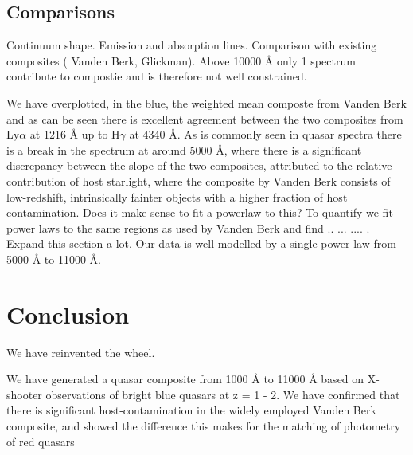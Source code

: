 \documentclass{aa}    %
\newcommand{\sectlabel}[1]{\label{sect:#1}}
\begin{document}
\subsection{Comparisons} \sectlabel{comparison}


Continuum shape. Emission and absorption lines. Comparison with existing composites ( Vanden Berk, Glickman). Above 10000 \r{A} only 1 spectrum contribute to compostie and is therefore not well constrained. 


 We have overplotted, in the blue, the weighted mean composte from Vanden Berk and as can be seen there is excellent agreement between the two composites from Ly$\alpha$ at 1216 \r{A} up to H$\gamma$ at 4340 \r{A}. As is commonly seen in quasar spectra there is a break in the spectrum at around 5000 \r{A}, where there is a significant discrepancy between the slope of the two composites, attributed to the relative contribution of host starlight, where the composite by Vanden Berk consists of low-redshift, intrinsically fainter objects with a higher fraction of host contamination. Does it make sense to fit a powerlaw to this? To quantify we fit power laws to the same regions as used by Vanden Berk and find .. ... .... . Expand this section a lot. Our data is well modelled by a single power law from 5000 \r{A} to 11000 \r{A}. 
 






\section{Conclusion}  \sectlabel{conclusion}


We have reinvented the wheel.

We have generated a quasar composite from 1000 \r{A} to 11000 \r{A} based on X-shooter observations of bright blue quasars at z = 1 - 2. We have confirmed that there is significant host-contamination in the widely employed Vanden Berk composite, and showed the difference this makes for the matching of photometry of red quasars


%
 

%
%
\end{document}
